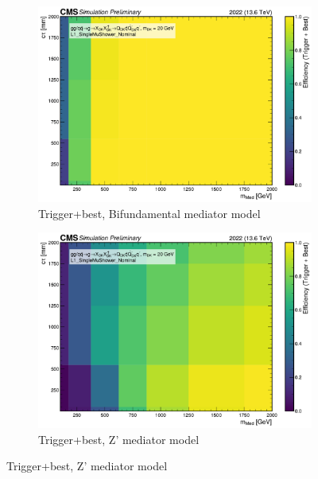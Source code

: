 \begin{figure}[h]
  \vspace{1em}

  \begin{subfigure}[t]{0.45\textwidth}
    \centering
    \includegraphics[width=\linewidth]{images/L1/llp_2D_tchan/trigeffplots2D_L1_efftype-trigplusbest_t-channel_mDark-20_L1_SingleMuShower_Nominal_study_cloppear.pdf}
    \caption{Trigger+best, Bifundamental mediator model}
    \label{fig:mus_trigplusbest_tchan}
  \end{subfigure}
  \hfill
  \begin{subfigure}[t]{0.45\textwidth}
    \centering
    \includegraphics[width=\linewidth]{images/L1/llp_2D_schan/trigeffplots2D_L1_efftype-trigplusbest_s-channel_mDark-20_L1_SingleMuShower_Nominal_study_cloppear.pdf}
    \caption{Trigger+best, Z' mediator model}
    \label{fig:mus_trigplusbest_schan}
  \end{subfigure}


\end{figure}
